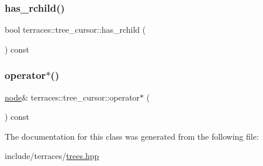 \subsubsection{\texorpdfstring{has\+\_\+rchild()}{has\_rchild()}}
{\footnotesize\ttfamily bool terraces\+::tree\+\_\+cursor\+::has\+\_\+rchild (\begin{DoxyParamCaption}{ }\end{DoxyParamCaption}) const\hspace{0.3cm}{\ttfamily [inline]}}

\mbox{\label{classterraces_1_1tree__cursor_a992f9c4a4cf22b17f3908b2c39105f75}} 
\subsubsection{\texorpdfstring{operator$\ast$()}{operator*()}}
{\footnotesize\ttfamily \hyperlink{structterraces_1_1node}{node}\& terraces\+::tree\+\_\+cursor\+::operator$\ast$ (\begin{DoxyParamCaption}{ }\end{DoxyParamCaption}) const\hspace{0.3cm}{\ttfamily [inline]}}



The documentation for this class was generated from the following file\+:\begin{DoxyCompactItemize}
\item 
include/terraces/\hyperlink{trees_8hpp}{trees.\+hpp}\end{DoxyCompactItemize}
